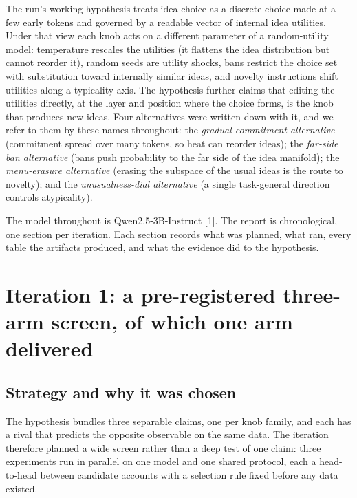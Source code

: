 \documentclass[11pt,letterpaper]{article}
\begin{document}
The run's working hypothesis treats idea choice as a discrete choice made at a few early tokens and governed by a readable vector of internal idea utilities. Under that view each knob acts on a different parameter of a random-utility model: temperature rescales the utilities (it flattens the idea distribution but cannot reorder it), random seeds are utility shocks, bans restrict the choice set with substitution toward internally similar ideas, and novelty instructions shift utilities along a typicality axis. The hypothesis further claims that editing the utilities directly, at the layer and position where the choice forms, is the knob that produces new ideas. Four alternatives were written down with it, and we refer to them by these names throughout: the \emph{gradual-commitment alternative} (commitment spread over many tokens, so heat can reorder ideas); the \emph{far-side ban alternative} (bans push probability to the far side of the idea manifold); the \emph{menu-erasure alternative} (erasing the subspace of the usual ideas is the route to novelty); and the \emph{unusualness-dial alternative} (a single task-general direction controls atypicality).

The model throughout is Qwen2.5-3B-Instruct [1]. The report is chronological, one section per iteration. Each section records what was planned, what ran, every table the artifacts produced, and what the evidence did to the hypothesis.

\section{Iteration 1: a pre-registered three-arm screen, of which one arm delivered}
\subsection{Strategy and why it was chosen}
The hypothesis bundles three separable claims, one per knob family, and each has a rival that predicts the opposite observable on the same data. The iteration therefore planned a wide screen rather than a deep test of one claim: three experiments run in parallel on one model and one shared protocol, each a head-to-head between candidate accounts with a selection rule fixed before any data existed.
\end{document}
